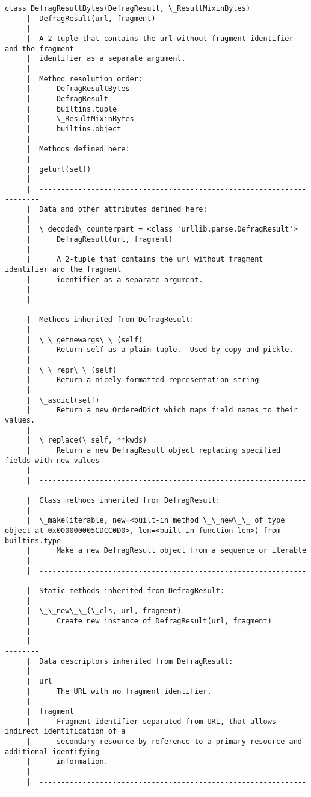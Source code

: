 \documentclass[11pt]{article}
\begin{document}
\begin{Verbatim}[commandchars=\\\{\}]
    class DefragResultBytes(DefragResult, \_ResultMixinBytes)
     |  DefragResult(url, fragment)
     |  
     |  A 2-tuple that contains the url without fragment identifier and the fragment
     |  identifier as a separate argument.
     |  
     |  Method resolution order:
     |      DefragResultBytes
     |      DefragResult
     |      builtins.tuple
     |      \_ResultMixinBytes
     |      builtins.object
     |  
     |  Methods defined here:
     |  
     |  geturl(self)
     |  
     |  ----------------------------------------------------------------------
     |  Data and other attributes defined here:
     |  
     |  \_decoded\_counterpart = <class 'urllib.parse.DefragResult'>
     |      DefragResult(url, fragment)
     |      
     |      A 2-tuple that contains the url without fragment identifier and the fragment
     |      identifier as a separate argument.
     |  
     |  ----------------------------------------------------------------------
     |  Methods inherited from DefragResult:
     |  
     |  \_\_getnewargs\_\_(self)
     |      Return self as a plain tuple.  Used by copy and pickle.
     |  
     |  \_\_repr\_\_(self)
     |      Return a nicely formatted representation string
     |  
     |  \_asdict(self)
     |      Return a new OrderedDict which maps field names to their values.
     |  
     |  \_replace(\_self, **kwds)
     |      Return a new DefragResult object replacing specified fields with new values
     |  
     |  ----------------------------------------------------------------------
     |  Class methods inherited from DefragResult:
     |  
     |  \_make(iterable, new=<built-in method \_\_new\_\_ of type object at 0x000000005CDCC0D0>, len=<built-in function len>) from builtins.type
     |      Make a new DefragResult object from a sequence or iterable
     |  
     |  ----------------------------------------------------------------------
     |  Static methods inherited from DefragResult:
     |  
     |  \_\_new\_\_(\_cls, url, fragment)
     |      Create new instance of DefragResult(url, fragment)
     |  
     |  ----------------------------------------------------------------------
     |  Data descriptors inherited from DefragResult:
     |  
     |  url
     |      The URL with no fragment identifier.
     |  
     |  fragment
     |      Fragment identifier separated from URL, that allows indirect identification of a
     |      secondary resource by reference to a primary resource and additional identifying
     |      information.
     |  
     |  ----------------------------------------------------------------------

\end{Verbatim}
\end{document}
